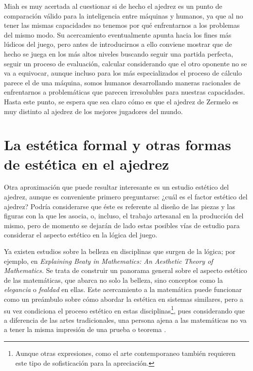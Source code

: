 \documentclass[twoside,openright,12pt,a4paper,spanish]{book}
\begin{document}
Miah es muy acertada al cuestionar si de hecho el ajedrez es un punto de comparación válido para la inteligencia entre máquinas y humanos, ya que al no tener las mismas capacidades no tenemos por qué enfrentarnos a los problemas del mismo modo. Su acercamiento eventualmente apunta hacia los fines más lúdicos del juego, pero antes de introducirnos a ello conviene mostrar que de hecho se juega en los más altos niveles buscando seguir una partida perfecta, seguir un proceso de evaluación, calcular considerando que el otro oponente no se va a equivocar, aunque incluso para los más especializados el proceso de cálculo parece el de una máquina, somos humanos desarrollando maneras racionales de enfrentarnos a problemáticas que parecen irresolubles para nuestras capacidades. Hasta este punto, se espera que sea claro c\'omo es que el ajedrez de Zermelo es muy distinto al ajedrez de los mejores jugadores del mundo.

\section{La est\'etica formal y otras formas de est\'etica en el ajedrez}

\noindent Otra aproximaci\'on que puede resultar interesante es un estudio est\'etico del ajedrez, aunque es conveniente primero preguntarse: ¿cuál es el factor estético del ajedrez? Podría considerarse que éste es referente al diseño de las piezas y las figuras con la que les asocia, o, incluso, el trabajo artesanal en la producción del mismo, pero de momento se dejarán de lado estas posibles vías de estudio para considerar el aspecto estético en la lógica del juego.

Ya existen estudios sobre la belleza en disciplinas que surgen de la lógica; por ejemplo, en \emph{Explaining Beaty in Mathematics: An Aesthetic Theory of Mathematics.} \cite{montano2013explaining} Se trata de construir un panorama general sobre el aspecto estético de las matemáticas, que abarca no solo la belleza, sino conceptos como la \emph{elegancia} o \emph{fealdad} en ellas. Este acercamiento a la matemática puede funcionar como un pre\'ambulo sobre cómo abordar la estética en sistemas similares, pero a su vez condiciona el proceso estético en estas disciplinas\footnote{Aunque otras expresiones, como el arte contemporaneo tambi\'en requieren este tipo de sofisticaci\'on para la apreciaci\'on.}, pues considerando que a diferencia de las artes tradicionales, una persona ajena a las matemáticas no va a tener la misma impresión de una prueba o teorema \cite[p. 168]{montano2013explaining}. 
\end{document}
